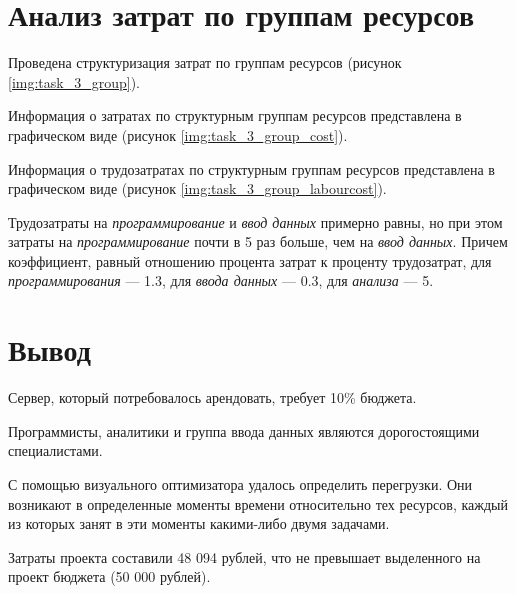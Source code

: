 \section{Анализ затрат по группам ресурсов}

Проведена структуризация затрат по группам ресурсов (рисунок \ref{img:task_3_group}).

\newpage
Информация о затратах по структурным группам ресурсов представлена в 
графическом виде (рисунок \ref{img:task_3_group_cost}).

Информация о трудозатратах по структурным группам ресурсов представлена в 
графическом виде (рисунок \ref{img:task_3_group_labourcost}).

\newpage
Трудозатраты на \textit{программирование} и \textit{ввод данных} примерно равны, но при этом затраты на \textit{программирование}
почти в 5 раз больше, чем на \textit{ввод данных}. Причем коэффициент, равный отношению процента затрат к 
проценту трудозатрат, для \textit{программирования} --- 1.3, для \textit{ввода данных} --- 0.3, для  \textit{анализа} --- 5.

\section{Вывод}

Сервер, который потребовалось арендовать, требует 10\% бюджета.

Программисты, аналитики и группа ввода данных являются дорогостоящими специалистами.

С помощью визуального оптимизатора удалось определить перегрузки. Они возникают в
определенные моменты времени относительно тех ресурсов, каждый из которых 
занят в эти моменты какими-либо двумя задачами.

Затраты проекта составили 48 094 рублей, что не превышает выделенного на проект бюджета (50 000 рублей).
